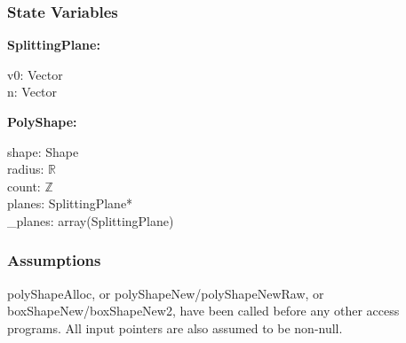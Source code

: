 \documentclass[12pt]{article}
\newcommand{\R}{$\mathbb{R}$}
\newcommand{\Z}{$\mathbb{Z}$}
\begin{document}
\subsubsection{State Variables} \label{SecSVPoly}
	\textbf{SplittingPlane:}
	\begin{multicols}{2}
		\noindent v0: Vector \\
		n: Vector 
	\end{multicols}
	\noindent \textbf{PolyShape:}
	\begin{multicols}{2}
		\noindent shape: Shape \\
		radius: \R \\
		count: \Z \\
		planes: SplittingPlane* \\
		_planes: array(SplittingPlane)
	\end{multicols}
	
	\iffalse %
	\noindent Note that \textit{count} is the number of vertices of the PolyShape, and both \textit{planes} and \textit{_planes} store the vertices of the PolyShape. \textit{_planes} are used if the PolyShape has at most \hyperref[SecECShape]{POLY_SHAPE_INLINE_ALLOC} vertices; otherwise, \textit{planes} are used.
	\fi

\subsubsection{Assumptions} \label{SecAPoly}
	polyShapeAlloc, or polyShapeNew/polyShapeNewRaw, or boxShapeNew/boxShapeNew2, have been called before any other access programs. All input pointers are also assumed to be non-null.
\end{document}
